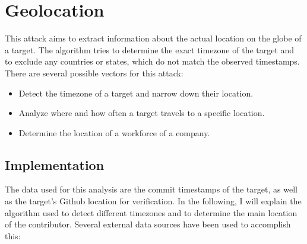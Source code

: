 \section{Geolocation}

This attack aims to extract information about the actual location on the globe of a target.
The algorithm tries to determine the exact timezone of the target and to exclude any countries or states, which do not match the observed timestamps.
There are several possible vectors for this attack:

\begin{itemize}
    \item Detect the timezone of a target and narrow down their location.
    \item Analyze where and how often a target travels to a specific location.
    \item Determine the location of a workforce of a company.
\end{itemize}


\subsection{Implementation}\label{travel-implementation}

The data used for this analysis are the commit timestamps of the target, as well as the target's Github location for verification.
In the following, I will explain the algorithm used to detect different timezones and to determine the main location of the contributor.
Several external data sources have been used to accomplish this:

